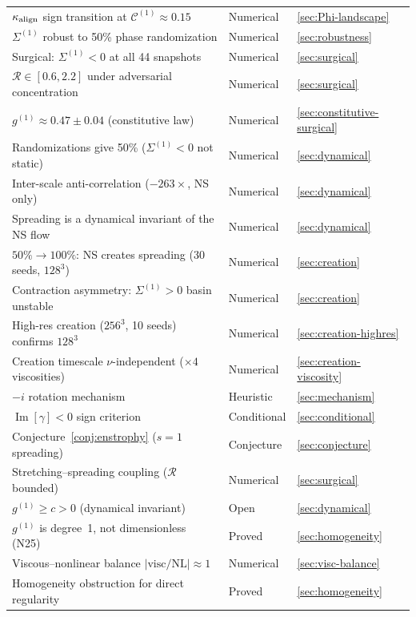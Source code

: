 \documentclass[11pt]{article}
\theoremstyle{definition}
\newcommand{\cC}{\mathcal{C}}
\DeclareMathOperator{\im}{Im}
\begin{document}
\begin{center}
\begin{tabular}{@{}lll@{}}
$\kappa_{\rm align}$ sign transition at $\cC^{(1)}\approx 0.15$
  & Numerical & \ref{sec:Phi-landscape} \\
$\Sigma^{(1)}$ robust to 50\% phase randomization
  & Numerical & \ref{sec:robustness} \\
Surgical: $\Sigma^{(1)}<0$ at all 44 snapshots
  & Numerical & \ref{sec:surgical} \\
$\mathcal{R}\in[0.6,2.2]$ under adversarial concentration
  & Numerical & \ref{sec:surgical} \\
$g^{(1)}\approx 0.47\pm 0.04$ (constitutive law)
  & Numerical & \ref{sec:constitutive-surgical} \\
Randomizations give 50\% ($\Sigma^{(1)}<0$ not static)
  & Numerical & \ref{sec:dynamical} \\
Inter-scale anti-correlation ($-263\times$, NS only)
  & Numerical & \ref{sec:dynamical} \\
Spreading is a dynamical invariant of the NS flow
  & Numerical & \ref{sec:dynamical} \\
$50\%\to 100\%$: NS creates spreading (30 seeds, $128^3$)
  & Numerical & \ref{sec:creation} \\
Contraction asymmetry: $\Sigma^{(1)}>0$ basin unstable
  & Numerical & \ref{sec:creation} \\
High-res creation ($256^3$, 10 seeds) confirms $128^3$
  & Numerical & \ref{sec:creation-highres} \\
Creation timescale $\nu$-independent ($\times 4$ viscosities)
  & Numerical & \ref{sec:creation-viscosity} \\
$-i$ rotation mechanism
  & Heuristic & \ref{sec:mechanism} \\
$\im[\gamma]<0$ sign criterion
  & Conditional & \ref{sec:conditional} \\
Conjecture~\ref{conj:enstrophy} ($s=1$ spreading)
  & Conjecture & \ref{sec:conjecture} \\
Stretching--spreading coupling ($\mathcal{R}$ bounded)
  & Numerical & \ref{sec:surgical} \\
$g^{(1)}\geq c > 0$ (dynamical invariant)
  & Open & \ref{sec:dynamical} \\
$g^{(1)}$ is degree~1, not dimensionless (N25)
  & Proved & \ref{sec:homogeneity} \\
Viscous--nonlinear balance $|\text{visc}/\text{NL}|\approx 1$
  & Numerical & \ref{sec:visc-balance} \\
Homogeneity obstruction for direct regularity
  & Proved & \ref{sec:homogeneity} \\

\end{tabular}
\end{center}
\end{document}
